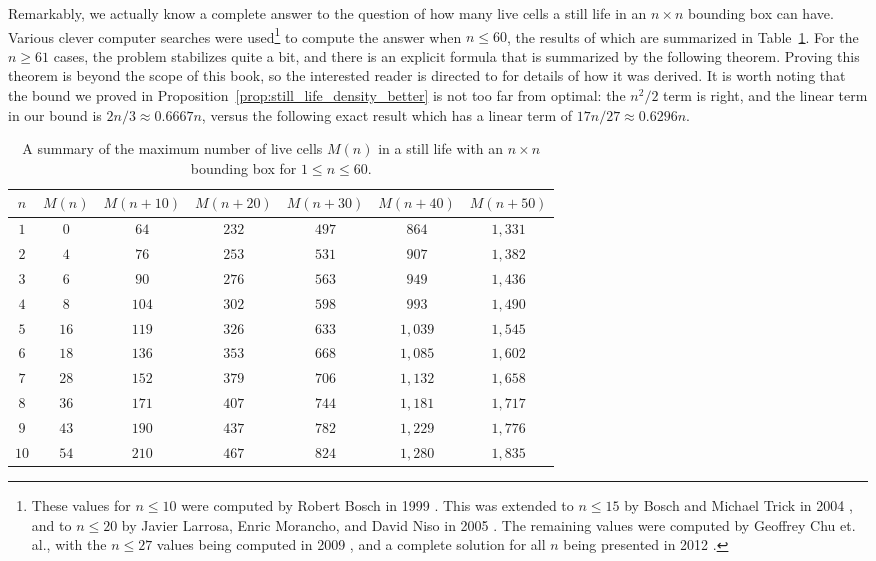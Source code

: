 Remarkably, we actually know a complete answer to the question of how many live cells a still life in an $n \times n$ bounding box can have. Various clever computer searches were used\footnote{These values for $n \leq 10$ were computed by Robert Bosch in 1999 \cite{Bos99}. This was extended to $n \leq 15$ by Bosch and Michael Trick in 2004 \cite{BT04}, and to $n \leq 20$ by Javier Larrosa, Enric Morancho, and David Niso in 2005 \cite{LMN05}. The remaining values were computed by Geoffrey Chu et. al., with the $n \leq 27$ values being computed in 2009 \cite{CSB09}, and a complete solution for all $n$ being presented in 2012 \cite{CS12}.} to compute the answer when $n \leq 60$, the results of which are summarized in Table~\ref{tab:still_life_n60}. For the $n \geq 61$ cases, the problem stabilizes quite a bit, and there is an explicit formula that is summarized by the following theorem. Proving this theorem is beyond the scope of this book, so the interested reader is directed to \cite{CS12} for details of how it was derived. It is worth noting that the bound we proved in Proposition~\ref{prop:still_life_density_better} is not too far from optimal: the $n^2/2$ term is right, and the linear term in our bound is $2n/3 \approx 0.6667n$, versus the following exact result which has a linear term of $17n/27 \approx 0.6296n$.

\begin{table}[!htb]\vspace*{0.05in}\setlength\arrayrulewidth{0.75pt}
	\begin{center}		
		\begin{tabular}{c | c c c c c c}
			\toprule
			$n$ & $M(n)$ & $M(n+10)$ & $M(n+20)$ & $M(n+30)$ & $M(n+40)$ & $M(n+50)$ \\ \midrule
			$1$ & $0$ & $64$ & $232$ & $497$ & $864$ & $1,331$ \\
			\rowcolor{gray!20} $2$ & $4$ & $76$ & $253$ & $531$ & $907$ & $1,382$ \\
			$3$ & $6$ & $90$ & $276$ & $563$ & $949$ & $1,436$ \\
			\rowcolor{gray!20} $4$ & $8$ & $104$ & $302$ & $598$ & $993$ & $1,490$ \\
			$5$ & $16$ & $119$ & $326$ & $633$ & $1,039$ & $1,545$ \\
			\rowcolor{gray!20} $6$ & $18$ & $136$ & $353$ & $668$ & $1,085$ & $1,602$ \\
			$7$ & $28$ & $152$ & $379$ & $706$ & $1,132$ & $1,658$ \\
			\rowcolor{gray!20} $8$ & $36$ & $171$ & $407$ & $744$ & $1,181$ & $1,717$ \\
			$9$ & $43$ & $190$ & $437$ & $782$ & $1,229$ & $1,776$ \\
			\rowcolor{gray!20} $10$ & $54$ & $210$ & $467$ & $824$ & $1,280$ & $1,835$ \\
			\bottomrule
		\end{tabular}
		\caption{A summary of the maximum number of live cells $M(n)$ in a still life with an $n \times n$ bounding box for $1 \leq n \leq 60$.}\label{tab:still_life_n60}
	\end{center}
\end{table}

